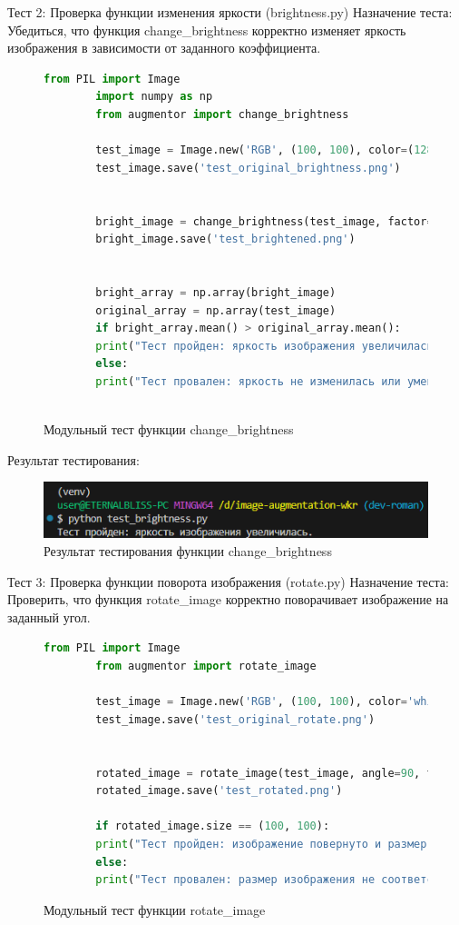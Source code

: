 Тест 2: Проверка функции изменения яркости (brightness.py)
Назначение теста: Убедиться, что функция change\_brightness корректно изменяет яркость изображения в зависимости от заданного коэффициента.

\begin{figure}[H]
	\begin{lstlisting}[language=Python]
		from PIL import Image
		import numpy as np
		from augmentor import change_brightness
		
		test_image = Image.new('RGB', (100, 100), color=(128, 128, 128))
		test_image.save('test_original_brightness.png')
		
		
		bright_image = change_brightness(test_image, factor=1.5)
		bright_image.save('test_brightened.png')
		
		
		bright_array = np.array(bright_image)
		original_array = np.array(test_image)
		if bright_array.mean() > original_array.mean():
		print("Тест пройден: яркость изображения увеличилась.")
		else:
		print("Тест провален: яркость не изменилась или уменьшилась.")



	\end{lstlisting}  
	\caption{Модульный тест функции change\_brightness}
	\label{model_test:test2}
\end{figure}

Результат тестирования:
\begin{figure}[H]
	\centering
	\includegraphics[width=0.7\linewidth]{images/resulttest2}
	\caption{Результат тестирования функции change\_brightness}
	\label{fig:resulttest2}
\end{figure}

Тест 3: Проверка функции поворота изображения (rotate.py)
Назначение теста: Проверить, что функция rotate\_image корректно поворачивает изображение на заданный угол.

\begin{figure}[H]
	\begin{lstlisting}[language=Python]
		from PIL import Image
		from augmentor import rotate_image
		
		test_image = Image.new('RGB', (100, 100), color='white')
		test_image.save('test_original_rotate.png')
		
		
		rotated_image = rotate_image(test_image, angle=90, target_size=(100, 100))
		rotated_image.save('test_rotated.png')
		
		if rotated_image.size == (100, 100):
		print("Тест пройден: изображение повернуто и размер скорректирован.")
		else:
		print("Тест провален: размер изображения не соответствует ожидаемому.")
	\end{lstlisting}  
	\caption{Модульный тест функции rotate\_image}
	\label{model_test:test3}
\end{figure}

